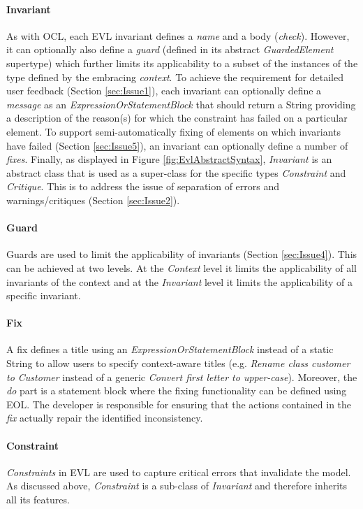 \paragraph{Invariant} As with OCL, each EVL invariant defines a \emph{name} and a body (\emph{check}). However, it can optionally also define a \emph{guard} (defined in its abstract \emph{GuardedElement} supertype) which further limits its applicability to a subset of the instances of the type defined by the embracing \emph{context}. To achieve the requirement for detailed user feedback (Section \ref{sec:Issue1}), each invariant can optionally define a \emph{message} as an \emph{ExpressionOrStatementBlock} that should return a String providing a description of the reason(s) for which the constraint has failed on a particular element. To support semi-automatically fixing of elements on which invariants have failed (Section \ref{sec:Issue5}), an invariant can optionally define a number of \emph{fixes}. Finally, as displayed in Figure \ref{fig:EvlAbstractSyntax}, \emph{Invariant} is an abstract class that is used as a super-class for the specific types \emph{Constraint} and \emph{Critique}. This is to address the issue of separation of errors and warnings/critiques (Section \ref{sec:Issue2}).

\paragraph{Guard} Guards are used to limit the applicability of invariants (Section \ref{sec:Issue4}). This can be achieved at two levels. At the \emph{Context} level it limits the applicability of all invariants of the context and at the \emph{Invariant} level it limits the applicability of a specific invariant.

\paragraph{Fix}
A fix defines a title using an \emph{ExpressionOrStatementBlock} instead of a static String to allow users to specify context-aware titles (e.g. \emph{Rename class customer to Customer} instead of a generic \emph{Convert first letter to upper-case}). Moreover, the \emph{do} part is a statement block where the fixing functionality can be defined using EOL. The developer is responsible for ensuring that the actions contained in the \emph{fix} actually repair the identified inconsistency.

\paragraph{Constraint}
\emph{Constraints} in EVL are used to capture critical errors that invalidate the model. As discussed above, \emph{Constraint} is a sub-class of \emph{Invariant} and therefore inherits all its features.

